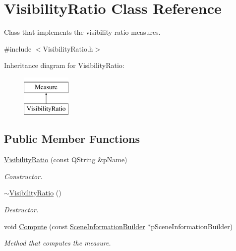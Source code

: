 \hypertarget{class_visibility_ratio}{\section{Visibility\+Ratio Class Reference}
\label{class_visibility_ratio}
}


Class that implements the visibility ratio measures.  




{\ttfamily \#include $<$Visibility\+Ratio.\+h$>$}

Inheritance diagram for Visibility\+Ratio\+:\begin{figure}[H]
\begin{center}
\leavevmode
\includegraphics[height=2.000000cm]{class_visibility_ratio}
\end{center}
\end{figure}
\subsection*{Public Member Functions}
\begin{DoxyCompactItemize}
\item 
\hyperlink{class_visibility_ratio_a03d3d48318a5eec33804c1ddcca8e022}{Visibility\+Ratio} (const Q\+String \&p\+Name)
\begin{DoxyCompactList}\small\item\em Constructor. \end{DoxyCompactList}\item 
\hyperlink{class_visibility_ratio_ab77dfb1e013c6c0f8a2e4773040c3767}{$\sim$\+Visibility\+Ratio} ()
\begin{DoxyCompactList}\small\item\em Destructor. \end{DoxyCompactList}\item 
void \hyperlink{class_visibility_ratio_a4625fcd0353851a0f3fc65a5d8ec258e}{Compute} (const \hyperlink{class_scene_information_builder}{Scene\+Information\+Builder} $\ast$p\+Scene\+Information\+Builder)
\begin{DoxyCompactList}\small\item\em Method that computes the measure. \end{DoxyCompactList}\end{DoxyCompactItemize}
